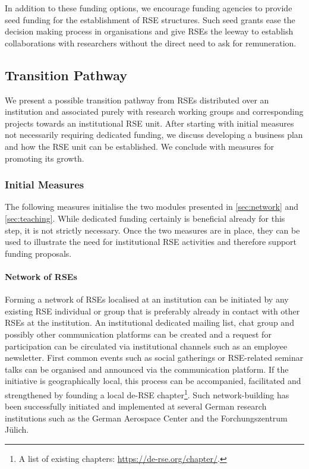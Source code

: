 \documentclass[a4paper]{article}
\begin{document}
In addition to these funding options, we encourage funding agencies to provide seed funding for the establishment of RSE structures.
Such seed grants ease the decision making process in organisations and give RSEs the leeway to establish collaborations with researchers without the direct need to ask for remuneration.

\subsection{Transition Pathway}

We present a possible transition pathway from RSEs distributed over an institution and associated purely with research working groups and corresponding projects towards an institutional RSE unit.
After starting with initial measures not necessarily requiring dedicated funding, we discuss developing a business plan and how the RSE unit can be established.
We conclude with measures for promoting its growth.

\subsubsection{Initial Measures}
The following measures initialise the two modules presented in \autoref{sec:network} and \autoref{sec:teaching}.
While dedicated funding certainly is beneficial already for this step, it is not strictly necessary.
Once the two measures are in place, they can be used to illustrate the need for institutional RSE activities and therefore support funding proposals.

\paragraph{Network of RSEs}
Forming a network of RSEs localised at an institution can be initiated by any existing RSE individual or group that is preferably already in contact with other RSEs at the institution.
An institutional dedicated mailing list, chat group and possibly other communication platforms can be created and a request for participation can be circulated via institutional channels such as an employee newsletter.
First common events such as social gatherings or RSE-related seminar talks can be organised and announced via the communication platform.
If the initiative is geographically local, this process can be accompanied, facilitated and strengthened by founding a local de-RSE chapter\footnote{A list of existing chapters: \url{https://de-rse.org/chapter/}.}.
Such network-building has been successfully initiated and implemented at several German research institutions such as the German Aerospace Center and the Forchungszentrum Jülich.
\end{document}
